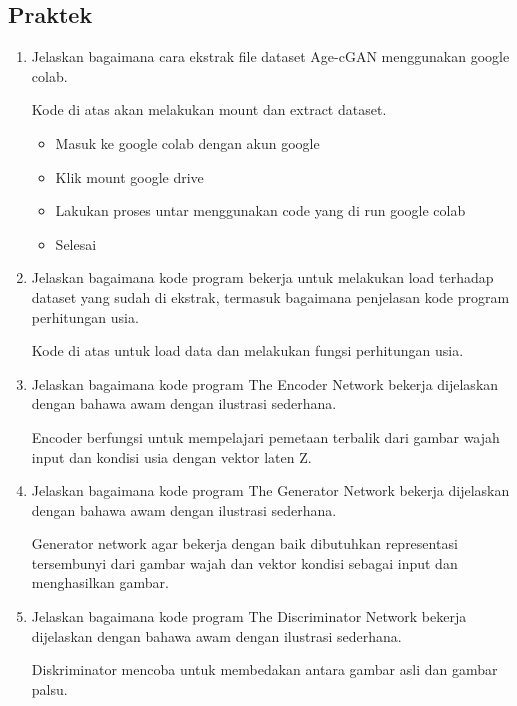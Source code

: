 \subsection{Praktek}
\begin{enumerate}
	\item Jelaskan bagaimana cara ekstrak file dataset Age-cGAN menggunakan google colab.
	\hfill\break

	
	Kode di atas akan melakukan mount dan extract dataset.

	\begin{itemize}
		\item Masuk ke google colab dengan akun google
		\item Klik mount google drive
		\item Lakukan proses untar menggunakan code yang di run google colab
		\item Selesai
	\end{itemize}

	\item Jelaskan bagaimana kode program bekerja untuk melakukan load terhadap dataset yang sudah di ekstrak, termasuk bagaimana penjelasan kode program perhitungan usia.
	\hfill\break
	
	Kode di atas untuk load data dan melakukan fungsi perhitungan usia.
	
	\item Jelaskan bagaimana kode program The Encoder Network bekerja dijelaskan dengan bahawa awam dengan ilustrasi sederhana.
	\hfill\break
	
	Encoder berfungsi untuk mempelajari pemetaan terbalik dari gambar wajah input dan kondisi usia dengan vektor laten Z.

	\item Jelaskan bagaimana kode program The Generator Network bekerja dijelaskan dengan bahawa awam dengan ilustrasi sederhana.
	\hfill\break
	
	Generator network agar bekerja dengan baik dibutuhkan representasi tersembunyi dari gambar wajah dan vektor kondisi sebagai input dan menghasilkan gambar.

	\item Jelaskan bagaimana kode program The Discriminator Network bekerja dijelaskan dengan bahawa awam dengan ilustrasi sederhana.
	\hfill\break
	
	Diskriminator mencoba untuk membedakan antara gambar asli dan gambar palsu.


\end{enumerate}
